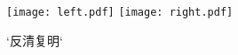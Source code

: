 \begin{figure}[htbp]
\centering
\texttt{[image: left.pdf]}
\texttt{[image: right.pdf]}
\caption{`反清复明`}
\end{figure}
